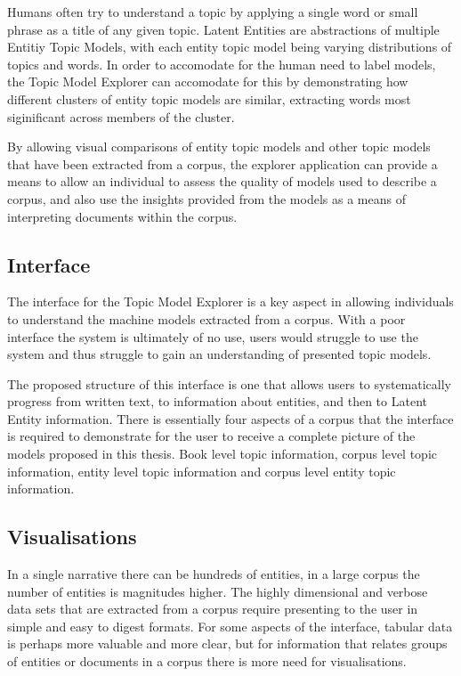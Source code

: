 \documentclass[10pt]{report}
\begin{document}
Humans often try to understand a topic by applying a single word or small phrase as a title of any given topic. Latent Entities are abstractions of multiple Entitiy Topic Models, with each entity topic model being varying distributions of topics and words. In order to accomodate for the human need to label models, the Topic Model Explorer can accomodate for this by demonstrating how different clusters of entity topic models are similar, extracting words most siginificant across members of the cluster.

By allowing visual comparisons of entity topic models and other topic models that have been extracted from a corpus, the explorer application can provide a means to allow an individual to assess the quality of models used to describe a corpus, and also use the insights provided from the models as a means of interpreting documents within the corpus.

\subsection{Interface}

The interface for the Topic Model Explorer is a key aspect in allowing individuals to understand the machine models extracted from a corpus. With a poor interface the system is ultimately of no use, users would struggle to use the system and thus struggle to gain an understanding of presented topic models.

The proposed structure of this interface is one that allows users to systematically progress from written text, to information about entities, and then to Latent Entity information. There is essentially four aspects of a corpus that the interface is required to demonstrate for the user to receive a complete picture of the models proposed in this thesis. Book level topic information, corpus level topic information, entity level topic information and corpus level entity topic information.

\subsection{Visualisations}
In a single narrative there can be hundreds of entities, in a large corpus the number of entities is magnitudes higher. The highly dimensional and verbose data sets that are extracted from a corpus require presenting to the user in simple and easy to digest formats. For some aspects of the interface, tabular data is perhaps more valuable and more clear, but for information that relates groups of entities or documents in a corpus there is more need for visualisations.
\end{document}
